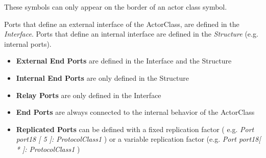 These symbols can only appear on the border of an actor class symbol. 

Ports that define an external interface of the ActorClass, are defined in the \textit{Interface}. Ports 
that define an internal interface are defined in the \textit{Structure} (e.g. internal ports).
\begin{itemize}
\item \textbf{External End Ports} are defined in the Interface and the Structure
\item \textbf{Internal End Ports} are only defined in the Structure
\item \textbf{Relay Ports} are only defined in the Interface
\item \textbf{End Ports} are always connected to the internal behavior of the ActorClass
\item \textbf{Replicated Ports} can be defined with a fixed replication factor ( e.g. \textit{Port port18 
[ 5 ]: ProtocolClass1} ) or a variable replication factor (e.g. \textit{Port port18[ * ]: ProtocolClass1} )
\end{itemize}
